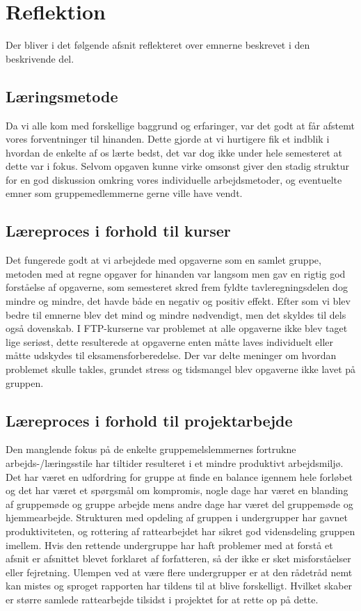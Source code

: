 \section{Reflektion}
Der bliver i det følgende afsnit reflekteret over emnerne beskrevet i den beskrivende del.
\subsection{Læringsmetode}
Da vi alle kom med forskellige baggrund og erfaringer, var det godt at får afstemt vores forventninger til hinanden. Dette gjorde at vi hurtigere fik et indblik i hvordan de enkelte af os lærte bedst, det var dog ikke under hele semesteret at dette var i fokus. Selvom opgaven kunne virke omsonst giver den stadig struktur for en god diskussion omkring vores individuelle arbejdsmetoder, og eventuelte emner som gruppemedlemmerne gerne ville have vendt.  
\subsection{Læreproces i forhold til kurser}
Det fungerede godt at vi arbejdede med opgaverne som en samlet gruppe, metoden med at regne opgaver for hinanden var langsom men gav en rigtig god forståelse af opgaverne, som semesteret skred frem fyldte tavleregningsdelen dog mindre og mindre, det havde både en negativ og positiv effekt. Efter som vi blev bedre til emnerne blev det mind og mindre nødvendigt, men det skyldes til dels også dovenskab. I FTP-kurserne var problemet at alle opgaverne ikke blev taget lige seriøst, dette resulterede at opgaverne enten måtte laves individuelt eller måtte udskydes til eksamensforberedelse. Der var delte meninger om hvordan problemet skulle takles, grundet stress og tidsmangel blev opgaverne ikke lavet på gruppen. 
\subsection{Læreproces i forhold til projektarbejde}
Den manglende fokus på de enkelte gruppemelslemmernes fortrukne arbejds-/læringsstile har tiltider resulteret i et mindre produktivt arbejdsmiljø. Det har været en udfordring for gruppe at finde en balance igennem hele forløbet og det har været et spørgsmål om kompromis, nogle dage har været en blanding af gruppemøde og gruppe arbejde mens andre dage har været del gruppemøde og hjemmearbejde. Strukturen med opdeling af gruppen i undergrupper har gavnet produktiviteten, og rottering af rattearbejdet har sikret god vidensdeling gruppen imellem. Hvis den rettende undergruppe har haft problemer med at forstå et afsnit er afsnittet blevet forklaret af forfatteren, så der ikke er sket misforståelser eller fejretning. Ulempen ved at være flere undergrupper er at den rådetråd nemt kan mistes og sproget rapporten har tildens til at blive forskelligt. Hvilket skaber er større samlede rattearbejde tilsidst i projektet for at rette op på dette. 
